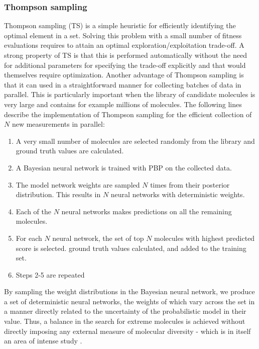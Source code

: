 \subsubsection{Thompson sampling}

Thompson sampling (TS) \cite{Thompson_1933} is a simple heuristic for efficiently identifying the optimal element in a set. Solving this problem with a small number of fitness evaluations requires to attain an optimal exploration/exploitation trade-off. A strong property of TS  is that this is performed automatically without the need for additional parameters for specifying the trade-off explicitly and that would themselves require optimization. Another advantage of Thompson sampling is that it can used in a straightforward manner for collecting batches of data in parallel. This is 
particularly important when the library of candidate molecules is very large and contains for example millions of molecules.
The following lines describe the implementation of Thompson sampling for the efficient collection of $N$ new measurements in parallel:
\begin{enumerate}
\item A very small number of molecules are selected randomly from the library and ground truth values are calculated.
\item A Bayesian neural network is trained with PBP on the collected data.
\item The model network weights are sampled $N$ times from their posterior distribution. This results in $N$ neural networks with deterministic weights.
\item Each of the $N$ neural networks makes predictions on all the remaining molecules.
\item For each $N$ neural network, the set of top $N$ molecules with highest predicted score is selected.
ground truth values calculated, and added to the training set.
\item Steps 2-5 are repeated
\end{enumerate}
By sampling the weight distributions in the Bayesian neural network, we produce a set of deterministic neural networks, the weights of which vary across the set in a manner directly related to the uncertainty of the probabilistic model in their value.  Thus, a balance in the search for extreme molecules is achieved without directly imposing any external measure of molecular diversity - which is in itself an area of intense study \cite{Maldonado_2006}.